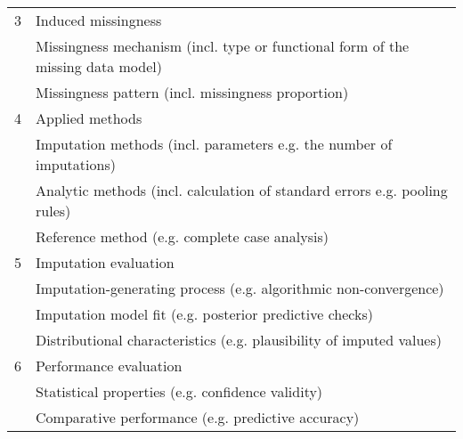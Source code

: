 \documentclass[bimj,fleqn]{w-art}
\begin{document}
\begin{table}[ht]
\begin{tabular}{ll}
3 & Induced missingness                                                                \\ \cline{2-2}
  & Missingness mechanism (incl. type or functional form of the missing data   model)  \\
  & Missingness pattern (incl. missingness proportion)                                 \\ \hline 
4 & Applied methods                                                                    \\ \cline{2-2}
  & Imputation methods (incl. parameters e.g. the number of imputations)               \\
  & Analytic methods (incl. calculation of standard errors e.g. pooling   rules)       \\
  & Reference method (e.g. complete case analysis)                                    \\ \hline 
5 & Imputation evaluation                                                              \\ \cline{2-2}
  & Imputation-generating process (e.g. algorithmic non-convergence)                   \\
  & Imputation model fit (e.g. posterior predictive checks)                            \\
  & Distributional characteristics (e.g. plausibility of imputed values)               \\ \hline 
6 & Performance evaluation                                                             \\ \cline{2-2}
  & Statistical properties (e.g. confidence validity)                                  \\
  & Comparative performance (e.g. predictive accuracy)                                 \\ \hline
\end{tabular}
\end{table}





\end{document}
